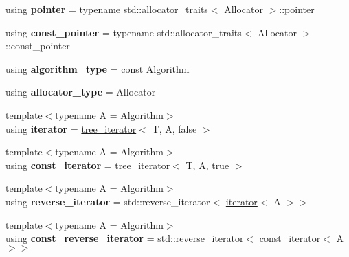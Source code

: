 \begin{DoxyCompactItemize}
\item 
using {\bfseries pointer} = typename std\+::allocator\+\_\+traits$<$ Allocator $>$\+::pointer\hypertarget{classds_1_1tree_ab1032344e4f8d7a086539f88c4864869}{}\label{classds_1_1tree_ab1032344e4f8d7a086539f88c4864869}

\item 
using {\bfseries const\+\_\+pointer} = typename std\+::allocator\+\_\+traits$<$ Allocator $>$\+::const\+\_\+pointer\hypertarget{classds_1_1tree_abb92fc6a216636a4fe9998b7feacefc1}{}\label{classds_1_1tree_abb92fc6a216636a4fe9998b7feacefc1}

\item 
using {\bfseries algorithm\+\_\+type} = const Algorithm\hypertarget{classds_1_1tree_a9f7d4f9807f973d29c33945818318054}{}\label{classds_1_1tree_a9f7d4f9807f973d29c33945818318054}

\item 
using {\bfseries allocator\+\_\+type} = Allocator\hypertarget{classds_1_1tree_acc849ed0bbd44378dcce258b9569ce2c}{}\label{classds_1_1tree_acc849ed0bbd44378dcce258b9569ce2c}

\item 
{\footnotesize template$<$typename A  = Algorithm$>$ }\\using {\bfseries iterator} = \hyperlink{classds_1_1tree__iterator}{tree\+\_\+iterator}$<$ T, A, false $>$\hypertarget{classds_1_1tree_a2622aec2a37612302fc732bf284bd825}{}\label{classds_1_1tree_a2622aec2a37612302fc732bf284bd825}

\item 
{\footnotesize template$<$typename A  = Algorithm$>$ }\\using {\bfseries const\+\_\+iterator} = \hyperlink{classds_1_1tree__iterator}{tree\+\_\+iterator}$<$ T, A, true $>$\hypertarget{classds_1_1tree_ab59e775388175382687b9b42c94261b0}{}\label{classds_1_1tree_ab59e775388175382687b9b42c94261b0}

\item 
{\footnotesize template$<$typename A  = Algorithm$>$ }\\using {\bfseries reverse\+\_\+iterator} = std\+::reverse\+\_\+iterator$<$ \hyperlink{classds_1_1tree__iterator}{iterator}$<$ A $>$$>$\hypertarget{classds_1_1tree_a6faabd63ae06bc2cd9bf30c35ccfd82c}{}\label{classds_1_1tree_a6faabd63ae06bc2cd9bf30c35ccfd82c}

\item 
{\footnotesize template$<$typename A  = Algorithm$>$ }\\using {\bfseries const\+\_\+reverse\+\_\+iterator} = std\+::reverse\+\_\+iterator$<$ \hyperlink{classds_1_1tree__iterator}{const\+\_\+iterator}$<$ A $>$$>$\hypertarget{classds_1_1tree_a66edea253548a2c7908477aba9894d89}{}\label{classds_1_1tree_a66edea253548a2c7908477aba9894d89}

\end{DoxyCompactItemize}
